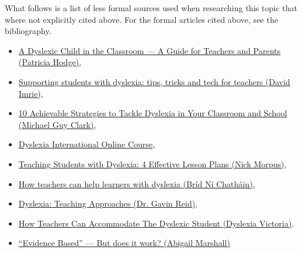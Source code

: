 \documentclass[17pt]{memoir}
\begin{document}
What follows is a list of less formal sources used when researching this topic that where not explicitly cited above. For the formal articles cited above, see the bibliography.
\begin{itemize}
	\item \href{https://www.dyslexia.com/about-dyslexia/understanding-dyslexia/guide-for-classroom-teachers/
}{A Dyslexic Child in the Classroom --- A Guide for Teachers and Parents (Patricia Hodge)},
	\item \href{https://www.theguardian.com/teacher-network/teacher-blog/2013/sep/09/supporting-students-with-dyslexia-teachers-tips-pupils}{Supporting students with dyslexia: tips, tricks and tech for teachers (David Imrie)},
	\item \href{https://educationtechnologysolutions.com.au/2015/02/10-achievable-strategies-to-tackle-dyslexia-in-your-classroom-and-school/}{10 Achievable Strategies to Tackle Dyslexia in Your Classroom and School (Michael Guy Clark)},
	\item \href{https://www.dyslexia-international.org/ONL/EN/Course/Welcome.htm
}{Dyslexia International Online Course},
	\item \href{https://blog.capterra.com/teaching-students-with-dyslexia-4-effective-lesson-plans/
}{Teaching Students with Dyslexia: 4 Effective Lesson Plans (Nick Morpus)},
	\item \href{https://www.britishcouncil.org/voices-magazine/how-teachers-can-help-learners-dyslexia
}{How teachers can help learners with dyslexia (Bríd Ní Chatháin)},
	\item \href{https://www.drgavinreid.com/free-resources/dyslexia-teaching-approaches/
}{Dyslexia: Teaching Approaches (Dr. Gavin Reid)},
	\item \href{http://www.dyslexiavictoriaonline.com/how-teachers-can-accommodate-the-dyslexic-student/
}{How Teachers Can Accommodate The Dyslexic Student (Dyslexia Victoria)}.
	\item \href{https://blog.dyslexia.com/evidence-based-but-does-it-work/}{“Evidence Based” — But does it work? (Abigail Marshall)}
\end{itemize}


 
\end{document}

